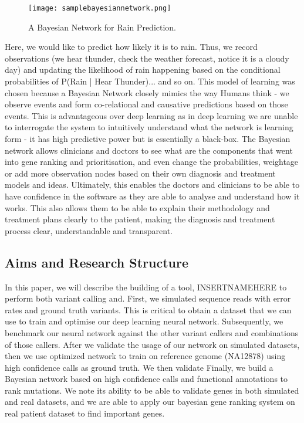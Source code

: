 \documentclass{article}
\begin{document}
\begin{figure}[H]
\texttt{[image: samplebayesiannetwork.png]}
\centering
\caption{A Bayesian Network for Rain Prediction. }
\end{figure}

 Here, we would like to predict how likely it is to rain. Thus, we record observations (we hear thunder, check the weather forecast, notice it is a cloudy day) and updating the likelihood of rain happening based on the conditional probabilities of P(Rain | Hear Thunder)... and so on. This model of learning was chosen because a Bayesian Network closely mimics the way Humans think - we observe events and form co-relational and causative predictions based on those events. This is advantageous over deep learning as in deep learning we are unable to interrogate the system to intuitively understand what the network is learning form - it has high predictive power but is essentially a black-box. The Bayesian network allows clinicians and doctors to see what are the components that went into gene ranking and prioritisation, and even change the probabilities, weightage or add more observation nodes based on their own diagnosis and treatment models and ideas. Ultimately, this enables the doctors and clinicians to be able to have confidence in the software as they are able to analyse and understand how it works. This also allows them to be able to explain their methodology and treatment plans clearly to the patient, making the diagnosis and treatment process clear, understandable and transparent.

\subsection{Aims and Research Structure}
In this paper, we will describe the building of a tool, INSERTNAMEHERE to perform both variant calling and. First, we simulated sequence reads with error rates and ground truth variants. This is critical to obtain a dataset that we can use to train and optimise our deep learning neural network. Subsequently, we benchmark our neural network against the other variant callers and combinations of those callers. After we validate the usage of our network on simulated datasets, then we use optimized network to train on reference genome (NA12878) using high confidence calls as ground truth. We then validate Finally, we build a Bayesian network based on high confidence calls and functional annotations to rank mutations. We note its ability to be able to validate genes in both simulated and real datasets, and we are able to apply our bayesian gene ranking system on real patient dataset to find important genes. 
\end{document}
